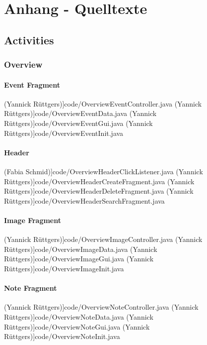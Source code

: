 \section{Anhang - Quelltexte}
\label{instal}

\subsection{Activities}
	\subsubsection{Overview}
		\paragraph{Event Fragment}
 (Yannick Rüttgers)]{code/OverviewEventController.java}
 (Yannick Rüttgers)]{code/OverviewEventData.java}
 (Yannick Rüttgers)]{code/OverviewEventGui.java}
 (Yannick Rüttgers)]{code/OverviewEventInit.java}
		\paragraph{Header}
 (Fabia Schmid)]{code/OverviewHeaderClickListener.java}
 (Yannick Rüttgers)]{code/OverviewHeaderCreateFragment.java}
 (Yannick Rüttgers)]{code/OverviewHeaderDeleteFragment.java}
 (Yannick Rüttgers)]{code/OverviewHeaderSearchFragment.java}
		\paragraph{Image Fragment}
 (Yannick Rüttgers)]{code/OverviewImageController.java}
 (Yannick Rüttgers)]{code/OverviewImageData.java}
 (Yannick Rüttgers)]{code/OverviewImageGui.java}
 (Yannick Rüttgers)]{code/OverviewImageInit.java}
		\paragraph{Note Fragment}
 (Yannick Rüttgers)]{code/OverviewNoteController.java}
 (Yannick Rüttgers)]{code/OverviewNoteData.java}
 (Yannick Rüttgers)]{code/OverviewNoteGui.java}
 (Yannick Rüttgers)]{code/OverviewNoteInit.java}

